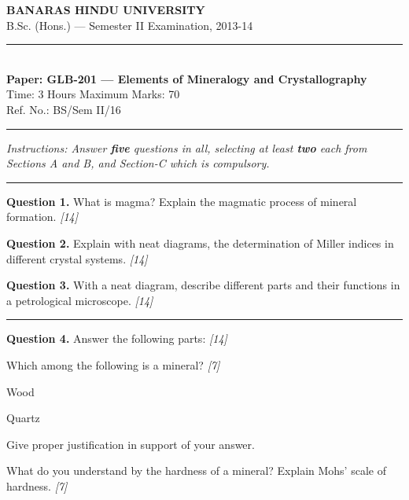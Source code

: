 \documentclass[11pt,a4paper]{article}
\newcommand{\pts}[1]{\hfill   \textit{[#1]}}
\begin{document}
\begin{center}
  {\large\bfseries BANARAS HINDU UNIVERSITY}\\[2pt]
  {\normalsize B.Sc. (Hons.) --- Semester II Examination, 2013-14}\\[6pt]
  \rule{0.8\linewidth}{0.5pt}\\[6pt]
  {\large\bfseries Paper: GLB-201 --- Elements of Mineralogy and Crystallography}\\[4pt]
  {\normalsize Time: 3 Hours \hfill Maximum Marks: 70}\\[2pt]
  {\small Ref. No.: BS/Sem II/16}
\end{center}
\rule{\linewidth}{0.4pt}
\smallskip



\noindent   \textit{Instructions: Answer   \textbf{five} questions in all, selecting at least   \textbf{two} each from Sections A and B, and Section-C which is compulsory.}
\bigskip

\bigskip


\rule{\linewidth}{0.4pt}\smallskip




\noindent   \textbf{Question 1.} What is magma? Explain the magmatic process of mineral formation. \pts{14}

\medskip


\noindent   \textbf{Question 2.} Explain with neat diagrams, the determination of Miller indices in different crystal systems. \pts{14}

\medskip


\noindent   \textbf{Question 3.} With a neat diagram, describe different parts and their functions in a petrological microscope. \pts{14}

\bigskip


\rule{\linewidth}{0.4pt}\smallskip




\noindent   \textbf{Question 4.} Answer the following parts: \pts{14}

\begin{parts}
  \item Which among the following is a mineral? \pts{7}
  
\begin{subparts}
    \item Wood
    \item Quartz
  \end{subparts}
  Give proper justification in support of your answer.
  
  \item What do you understand by the hardness of a mineral? Explain Mohs' scale of hardness. \pts{7}
\end{parts}
\end{document}
